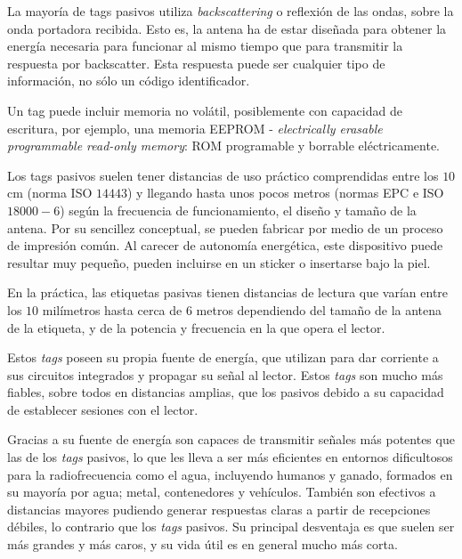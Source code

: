 La mayoría de tags pasivos utiliza \emph{backscattering} o reflexión de las ondas, sobre la onda portadora recibida. Esto es, la antena ha de estar diseñada para obtener la energía necesaria para funcionar al mismo tiempo que para transmitir la respuesta por backscatter. Esta respuesta puede ser cualquier tipo de información, no sólo un código identificador.



Un tag puede incluir memoria no volátil, posiblemente con capacidad de escritura, por ejemplo, una memoria EEPROM - \emph{electrically erasable programmable read-only memory}: ROM programable y borrable eléctricamente. 

Los tags pasivos suelen tener distancias de uso práctico comprendidas entre los $10$cm (norma ISO $14443$) y llegando hasta unos pocos metros (normas EPC e ISO $18000-6$) según la frecuencia de funcionamiento, el diseño y tamaño de la antena. Por su sencillez conceptual, se pueden fabricar por medio de un proceso de impresión común. Al carecer de autonomía energética, este dispositivo puede resultar muy pequeño, pueden incluirse en un sticker o insertarse bajo la piel.


En la práctica, las etiquetas pasivas tienen distancias de lectura que varían entre los $10$ milímetros hasta cerca de $6$ metros dependiendo del tamaño de la antena de la etiqueta, y de la potencia y frecuencia en la que opera el lector.



Estos \emph{tags} poseen su propia fuente de energía, que utilizan para dar corriente a sus circuitos integrados y propagar su señal al
lector. Estos \emph{tags} son mucho más fiables, sobre todos en distancias amplias, que los pasivos debido a su capacidad de establecer sesiones con el lector.

Gracias a su fuente de energía son capaces de transmitir señales más potentes que las de los \emph{tags} pasivos, lo que les lleva a ser más eficientes en entornos dificultosos para la radiofrecuencia como el agua, incluyendo humanos y ganado, formados en su mayoría
por agua; metal, contenedores y vehículos. También son efectivos a distancias mayores pudiendo generar respuestas claras a partir de recepciones débiles, lo contrario que los \emph{tags} pasivos. Su principal desventaja es que suelen ser más grandes y más caros, y su vida útil es en general mucho más corta.

